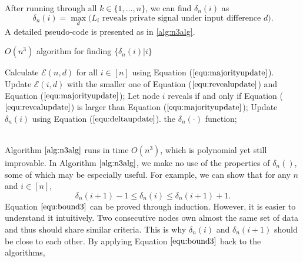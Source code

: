 \documentclass[a4paper,UKenglish]{lipics}
\theoremstyle{definition}
\newcommand{\hide}[1]{} %
\begin{document}
After running through all $k\in \{1, \dots, n\}$, we can find $\delta_n(i)$ as
\begin{equation}
\label{equ:deltaupdate}
	\delta_n(i)
	 = 
	 \max_{d} \Big( \text{$L_i$ reveals private signal under input difference $d$} \Big).
\end{equation}
A detailed pseudo-code is presented as in \ref{alg:n3alg}.
\begin{algorithm}[htb]
\caption{$O(n^3)$ algorithm for finding $\{\delta_n(i)|i\}$} \label{alg:n3alg}
\begin{algorithmic}[1]
\hide{
\REQUIRE ~~\\
	The set of positive samples for current batch, $P_n$;\\
	The set of unlabeled samples for current batch, $U_n$;\\
	Ensemble of classifiers on former batches, $E_{n-1}$;\\
\ENSURE ~~\\              
	Ensemble of classifiers on the current batch, $E_n$;
	}
\STATE Calculate $\mathcal{E}(n,d)$ for all $i\in [n]$ using Equation ($\ref{equ:majorityupdate}$). 
	\STATE Update $\mathcal{E}(i,d)$ with the smaller one of Equation ($\ref{equ:revealupdate}$) and Equation ($\ref{equ:majorityupdate}$);
	\STATE Let node $i$ reveals if and only if Equation ($\ref{equ:revealupdate}$) is larger than Equation ($\ref{equ:majorityupdate}$);
\ENDFOR
{}
	\STATE Update $\delta_n(i)$ using Equation ($\ref{equ:deltaupdate}$).
\ENDFOR
\RETURN the $\delta_n(\cdot)$ function;

\end{algorithmic}
\end{algorithm}
\\
Algorithm $\ref{alg:n3alg}$ runs in time $O(n^3)$, which is polynomial yet still improvable. 
In Algorithm $\ref{alg:n3alg}$, we make no use of the properties of $\delta_n()$,
	some of which may be especially useful.
For example, we can show that for any $n$ and $i\in[n]$,
\begin{equation}
\label{equ:bound3}
\delta_n(i+1)-1\le \delta_n(i)\le \delta_n(i+1)+1.
\end{equation}
Equation $\ref{equ:bound3}$ can be proved through induction.
However, it is easier to understand it intuitively.
Two consecutive nodes own almost the same set of data and thus should share similar criteria.
This is why $\delta_n(i)$ and $\delta_n(i+1)$ should be close to each other.  
By applying Equation $\eqref{equ:bound3}$ back to the algorithms, 
\end{document}
